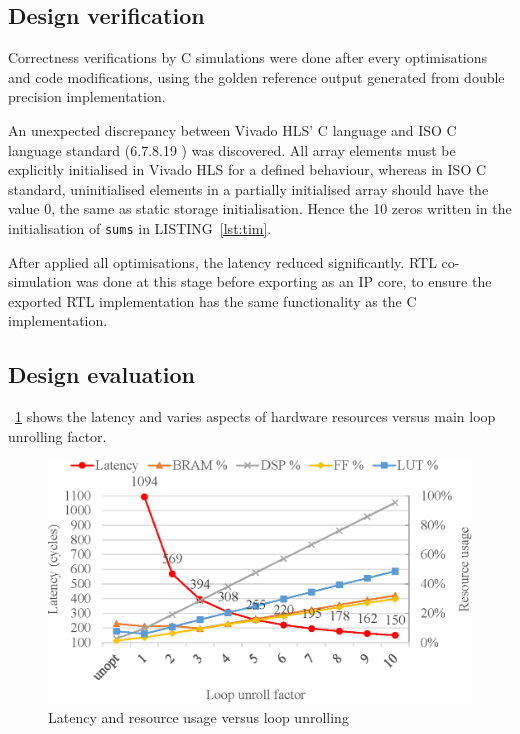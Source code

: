 \documentclass[journal]{IEEEtran}
\newcommand{\fref}[1]{\figurename~\ref{#1}}
\newcommand{\lref}[1]{LISTING~\ref{#1}}
\begin{document}
\subsection{Design verification}

Correctness verifications by C simulations were done after every optimisations and code modifications, using the golden reference output generated from double precision implementation.

An unexpected discrepancy between Vivado HLS' C language and ISO C language standard (6.7.8.19 \cite{iso1999iec}) was discovered. All array elements must be explicitly initialised in Vivado HLS for a defined behaviour, whereas in ISO C standard, uninitialised elements in a partially initialised array should have the value 0, the same as static storage initialisation. Hence the 10 zeros written in the initialisation of \texttt{sums} in \lref{lst:tim}.

After applied all optimisations, the latency reduced significantly. RTL co-simulation was done at this stage before exporting as an IP core, to ensure the exported RTL implementation has the same functionality as the C implementation.

\subsection{Design evaluation}

\fref{fig:latency} shows the latency and varies aspects of hardware resources versus main loop unrolling factor.

\begin{figure}[ht]
	\centering
	\includegraphics[width=\columnwidth]{latency}
	\caption{Latency and resource usage versus loop unrolling}
	\label{fig:latency}
\end{figure}
\end{document}
